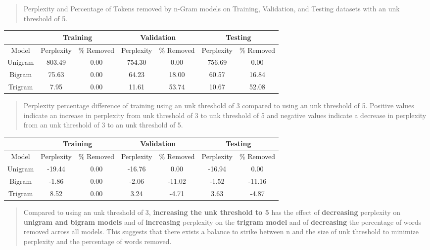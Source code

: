\begin{quote}
    Perplexity and Percentage of Tokens removed by n-Gram models on Training, Validation, and Testing datasets with an unk threshold of 5.
\end{quote}

\begin{center}
    \begin{tabular}{ |c|c|c|c|c|c|c| } 
	\hline
	 & \multicolumn{2}{c|}{Training} & \multicolumn{2}{c|}{Validation} & \multicolumn{2}{c|}{Testing} \\ 
	\hline
	Model & Perplexity & \% Removed & Perplexity & \% Removed & Perplexity & \% Removed \\
	\hline
	Unigram & 803.49 & 0.00 & 754.30 & 0.00 & 756.69 & 0.00 \\ 
	\hline
	Bigram & 75.63 & 0.00 & 64.23 & 18.00 & 60.57 & 16.84 \\ 
	\hline
	Trigram & 7.95 & 0.00 & 11.61 & 53.74 & 10.67 & 52.08 \\ 
	\hline
    \end{tabular}
\end{center}

\begin{quote}
    Perplexity percentage difference of training using an unk threshold of 3 compared to using an unk threshold of 5. Positive values indicate an increase in perplexity from unk threshold of 3 to unk threshold of 5 and negative values indicate a decrease in perplexity from an unk threshold of 3 to an unk threshold of 5.
\end{quote}

\begin{center}
     \begin{tabular}{ |c|c|c|c|c|c|c| } 
	\hline
	 & \multicolumn{2}{c|}{Training} & \multicolumn{2}{c|}{Validation} & \multicolumn{2}{c|}{Testing} \\ 
	\hline
	Model & Perplexity & \% Removed & Perplexity & \% Removed & Perplexity & \% Removed \\
	\hline
	Unigram & -19.44 & 0.00 & -16.76 & 0.00 & -16.94 & 0.00 \\ 
	\hline
	Bigram & -1.86 & 0.00 & -2.06 & -11.02 & -1.52 & -11.16 \\ 
	\hline
	Trigram & 8.52 & 0.00 & 3.24 & -4.71 & 3.63 & -4.87 \\ 
	\hline
    \end{tabular}
\end{center}

\begin{quote}
Compared to using an unk threshold of 3, {\bf increasing the unk threshold to 5} has the effect of {\bf decreasing} perplexity on {\bf unigram and bigram models} and of {\bf increasing} perplexity on the {\bf trigram model} and of {\bf decreasing} the percentage of words removed across all models. This suggests that there exists a balance to strike between n and the size of unk threshold to minimize perplexity and the percentage of words removed.  
\end{quote}
